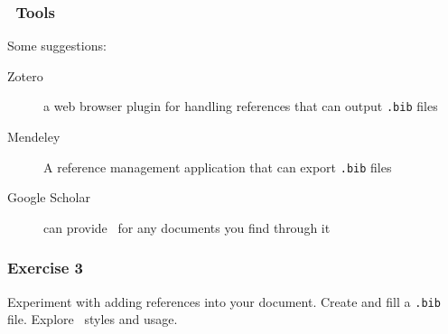 \documentclass[mathserif]{beamer}
\begin{document}
\begin{frame}[fragile]
\frametitle{\BibTeX\ Tools}

\vfill
Some suggestions:
\vfill
\begin{description}
	\item[Zotero] a web browser plugin for handling references that can output \texttt{.bib} files
	\item[Mendeley] A reference management application that can export \texttt{.bib} files
	\item[Google Scholar] can provide \BibTeX\ for any documents you find through it
\end{description}
\vfill

\end{frame}

\begin{frame}[fragile]
\frametitle{Exercise 3}
\vfill
Experiment with adding references into your document.
\vfill
Create and fill a \texttt{.bib} file.
\vfill
Explore \BibTeX\ styles and usage.
\vfill
\end{frame}
\end{document}
